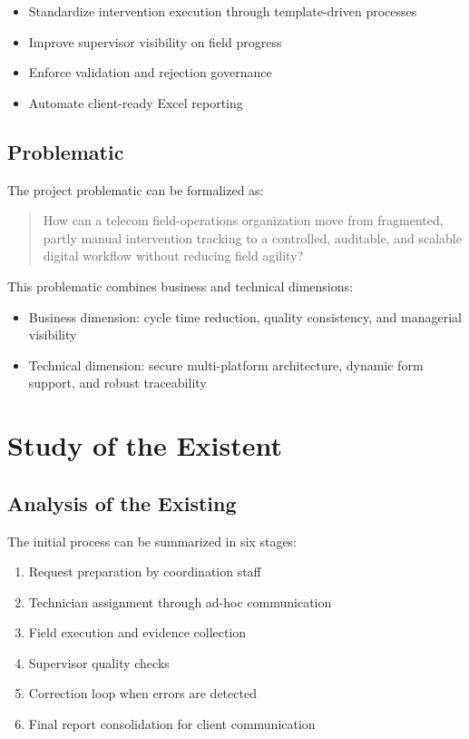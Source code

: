 \begin{itemize}
\item Standardize intervention execution through template-driven processes
\item Improve supervisor visibility on field progress
\item Enforce validation and rejection governance
\item Automate client-ready Excel reporting
\end{itemize}

\subsection{Problematic}

The project problematic can be formalized as:

\begin{quote}
How can a telecom field-operations organization move from fragmented, partly manual intervention tracking to a controlled, auditable, and scalable digital workflow without reducing field agility?
\end{quote}

This problematic combines business and technical dimensions:

\begin{itemize}
\item Business dimension: cycle time reduction, quality consistency, and managerial visibility
\item Technical dimension: secure multi-platform architecture, dynamic form support, and robust traceability
\end{itemize}

\section{Study of the Existent}

\subsection{Analysis of the Existing}

The initial process can be summarized in six stages:

\begin{enumerate}
\item Request preparation by coordination staff
\item Technician assignment through ad-hoc communication
\item Field execution and evidence collection
\item Supervisor quality checks
\item Correction loop when errors are detected
\item Final report consolidation for client communication
\end{enumerate}

